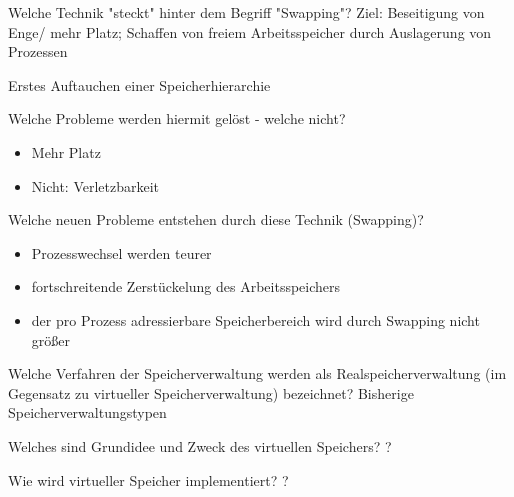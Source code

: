\documentclass[avery5371]{flashcards}
\begin{document}
\begin{flashcard}[Speichermanagement]{Welche Technik "steckt" hinter dem Begriff "Swapping"? }
    Ziel: Beseitigung von Enge/ mehr Platz; Schaffen von freiem Arbeitsspeicher durch Auslagerung von Prozessen

    Erstes Auftauchen einer Speicherhierarchie
\end{flashcard}

\begin{flashcard}[Speichermanagement]{Welche Probleme werden hiermit gelöst - welche nicht? }
    \begin{itemize}
        \item Mehr Platz
        \item Nicht: Verletzbarkeit
    \end{itemize}
\end{flashcard}

\begin{flashcard}[Speichermanagement]{Welche neuen Probleme entstehen durch diese Technik (Swapping)?}
    \begin{itemize}
        \item Prozesswechsel werden teurer
        \item fortschreitende Zerstückelung des Arbeitsspeichers
        \item der pro Prozess adressierbare Speicherbereich wird durch Swapping nicht größer
    \end{itemize}
\end{flashcard}

\begin{flashcard}[Speichermanagement]{Welche Verfahren der Speicherverwaltung werden als Realspeicherverwaltung (im Gegensatz zu virtueller Speicherverwaltung) bezeichnet?}
    Bisherige Speicherverwaltungstypen
\end{flashcard}

\begin{flashcard}[Speichermanagement]{Welches sind Grundidee und Zweck des virtuellen Speichers? }
    ?
\end{flashcard}

\begin{flashcard}[Speichermanagement]{Wie wird virtueller Speicher implementiert? }
    ?
\end{flashcard}
\end{document}
